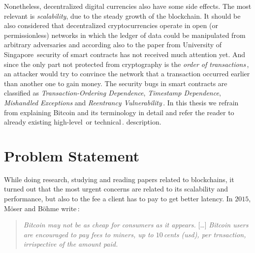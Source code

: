 \documentclass[USenglish]{uit-thesis}
\begin{document}
Nonetheless, decentralized digital currencies also have some side effects.
The most relevant is \emph{scalability}, due to the steady growth of the
blockchain. It should be also considered that
decentralized cryptocurrencies operate in open (or permissionless) networks
in which the ledger of data could be manipulated from arbitrary adversaries and
according also to the paper from University of Singapore\,\cite{Luu:2016}
security of smart contracts has not received much attention yet. And since the
only part not protected from cryptography is the \emph{order of transactions}\,\cite{ethereum_white_paper},
an attacker would try to convince the network that a transaction
occurred earlier than another one to gain money.
The security bugs in smart contracts are classified as \emph{Transaction-Ordering Dependence},
\emph{Timestamp Dependence}, \emph{Mishandled Exceptions}
and \emph{Reentrancy Vulnerability}\,\cite{Luu:2016}.
In this thesis we refrain from explaining Bitcoin and its terminology in detail
and refer the reader to already existing high-level\,\cite{Underwood:2016:BBB,
Bohme2015BETG}
or technical\,\cite{Nakamoto_bitcoin, ethereum_white_paper}.
 description.
\section{Problem Statement}
\label{sec:probdefinition}
 

While doing research, studying and reading papers related to blockchains,
it turned out that the most urgent concerns are related to
its scalability and performance, but also to the fee
a client has to pay to get better latency.
In $2015$, Möser and Böhme write\,\cite{Moser2015}:
\begin{quote}
	\emph{Bitcoin may not be as cheap for consumers as it appears.}
	[\dots]
	\emph{Bitcoin users are encouraged to pay fees to miners, up
	to $10$\,cents (\gls{usd}), per trnsaction, irrispective of the amount
paid.}
\end{quote}
\end{document}
